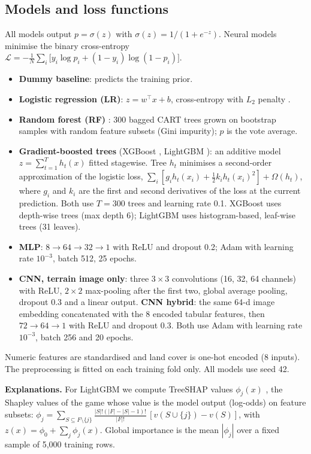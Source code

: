 \documentclass{article}
\begin{document}
\subsection{Models and loss functions}
All models output $p=\sigma(z)$ with $\sigma(z)=1/(1+e^{-z})$. Neural models minimise the binary cross-entropy
$\mathcal{L}=-\tfrac{1}{N}\sum_i\big[y_i\log p_i+(1-y_i)\log(1-p_i)\big]$.
\begin{itemize}
\item \textbf{Dummy baseline}: predicts the training prior.
\item \textbf{Logistic regression (LR)}: $z=w^\top x+b$, cross-entropy with $L_2$ penalty \cite{pedregosa2011sklearn}.
\item \textbf{Random forest (RF)} \cite{breiman2001rf}: 300 bagged CART trees grown on bootstrap samples with random feature subsets (Gini impurity); $p$ is the vote average.
\item \textbf{Gradient-boosted trees} (XGBoost \cite{chen2016xgboost}, LightGBM \cite{ke2017lightgbm}): an additive model $z=\sum_{t=1}^{T}h_t(x)$ fitted stagewise. Tree $h_t$ minimises a second-order approximation of the logistic loss, $\sum_i[g_i h_t(x_i)+\tfrac12 k_i h_t(x_i)^2]+\Omega(h_t)$, where $g_i$ and $k_i$ are the first and second derivatives of the loss at the current prediction. Both use $T=300$ trees and learning rate 0.1. XGBoost uses depth-wise trees (max depth 6); LightGBM uses histogram-based, leaf-wise trees (31 leaves).
\item \textbf{MLP}: $8\!\to\!64\!\to\!32\!\to\!1$ with ReLU and dropout 0.2; Adam \cite{kingma2015adam} with learning rate $10^{-3}$, batch 512, 25 epochs.
\item \textbf{CNN, terrain image only}: three $3\times3$ convolutions (16, 32, 64 channels) with ReLU, $2\times2$ max-pooling after the first two, global average pooling, dropout 0.3 and a linear output. \textbf{CNN hybrid}: the same 64-d image embedding concatenated with the 8 encoded tabular features, then $72\!\to\!64\!\to\!1$ with ReLU and dropout 0.3. Both use Adam with learning rate $10^{-3}$, batch 256 and 20 epochs.
\end{itemize}
Numeric features are standardised and land cover is one-hot encoded (8 inputs). The preprocessing is fitted on each training fold only. All models use seed 42.

\textbf{Explanations.} For LightGBM we compute TreeSHAP values $\phi_j(x)$ \cite{lundberg2020trees}, the Shapley values of the game whose value is the model output (log-odds) on feature subsets: $\phi_j=\sum_{S\subseteq F\setminus\{j\}}\frac{|S|!(|F|-|S|-1)!}{|F|!}\,[v(S\cup\{j\})-v(S)]$, with $z(x)=\phi_0+\sum_j\phi_j(x)$. Global importance is the mean $|\phi_j|$ over a fixed sample of 5,000 training rows.
\end{document}
